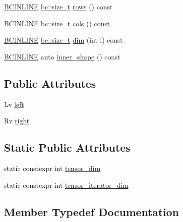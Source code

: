 \begin{DoxyCompactItemize}
\item 
\hyperlink{common_8h_a6699e8b0449da5c0fafb878e59c1d4b1}{B\+C\+I\+N\+L\+I\+NE} \hyperlink{namespacebc_aaf8e3fbf99b04b1b57c4f80c6f55d3c5}{bc\+::size\+\_\+t} \hyperlink{structbc_1_1tensors_1_1exprs_1_1Bin__Op_a64a12bb5bea6788976aa13eb55dbde67}{rows} () const
\item 
\hyperlink{common_8h_a6699e8b0449da5c0fafb878e59c1d4b1}{B\+C\+I\+N\+L\+I\+NE} \hyperlink{namespacebc_aaf8e3fbf99b04b1b57c4f80c6f55d3c5}{bc\+::size\+\_\+t} \hyperlink{structbc_1_1tensors_1_1exprs_1_1Bin__Op_ae90cf0485e63626093ebbb6a6abf8f12}{cols} () const
\item 
\hyperlink{common_8h_a6699e8b0449da5c0fafb878e59c1d4b1}{B\+C\+I\+N\+L\+I\+NE} \hyperlink{namespacebc_aaf8e3fbf99b04b1b57c4f80c6f55d3c5}{bc\+::size\+\_\+t} \hyperlink{structbc_1_1tensors_1_1exprs_1_1Bin__Op_ae9ba3f351d29fa9852e90f35890127d6}{dim} (int i) const
\item 
\hyperlink{common_8h_a6699e8b0449da5c0fafb878e59c1d4b1}{B\+C\+I\+N\+L\+I\+NE} auto \hyperlink{structbc_1_1tensors_1_1exprs_1_1Bin__Op_a6d38ff7ba2dabc884373d141a0a2e924}{inner\+\_\+shape} () const
\end{DoxyCompactItemize}
\subsection*{Public Attributes}
\begin{DoxyCompactItemize}
\item 
Lv \hyperlink{structbc_1_1tensors_1_1exprs_1_1Bin__Op_a0fcb386ccdf770056af498257790126a}{left}
\item 
Rv \hyperlink{structbc_1_1tensors_1_1exprs_1_1Bin__Op_a28b81329d59ce09f0260a76e5e0bd215}{right}
\end{DoxyCompactItemize}
\subsection*{Static Public Attributes}
\begin{DoxyCompactItemize}
\item 
static constexpr int \hyperlink{structbc_1_1tensors_1_1exprs_1_1Bin__Op_a36cea8ca02ccaecc1b8ce221b93a865a}{tensor\+\_\+dim}
\item 
static constexpr int \hyperlink{structbc_1_1tensors_1_1exprs_1_1Bin__Op_aec48bb277f9e8b990c6dbe790f13b782}{tensor\+\_\+iterator\+\_\+dim}
\end{DoxyCompactItemize}


\subsection{Member Typedef Documentation}
\mbox{\label{structbc_1_1tensors_1_1exprs_1_1Bin__Op_a5e39aa2bb60266199be2fc701b0edaaf}} 
